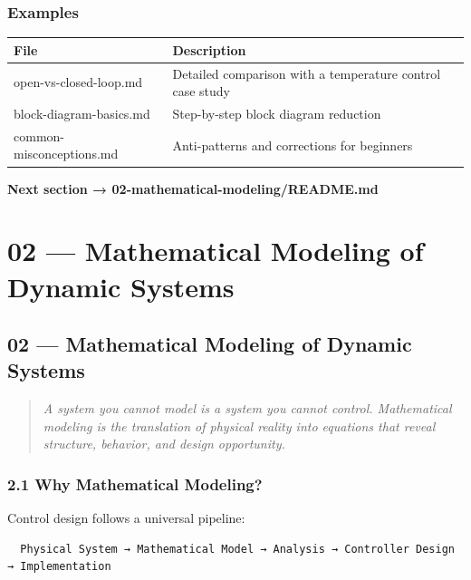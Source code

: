 \documentclass[11pt,a4paper]{book}
\begin{document}
\medskip\noindent\hrulefill\medskip

\subsection{Examples}

\begin{center}
\begin{tabular}{|l|l|}
\hline
File & Description \\
\hline
open-vs-closed-loop.md & Detailed comparison with a temperature control case study \\
block-diagram-basics.md & Step-by-step block diagram reduction \\
common-misconceptions.md & Anti-patterns and corrections for beginners \\
\hline
\end{tabular}
\end{center}

\medskip\noindent\hrulefill\medskip

\textbf{Next section → 02-mathematical-modeling/README.md}


\chapter{02 — Mathematical Modeling of Dynamic Systems}
\section{02 — Mathematical Modeling of Dynamic Systems}

\begin{quote}
\textit{A system you cannot model is a system you cannot control. Mathematical modeling is the translation of physical reality into equations that reveal structure, behavior, and design opportunity.}
\end{quote}

\medskip\noindent\hrulefill\medskip

\subsection{2.1 Why Mathematical Modeling?}

Control design follows a universal pipeline:

\begin{lstlisting}
  Physical System → Mathematical Model → Analysis → Controller Design → Implementation
\end{lstlisting}
\end{document}
